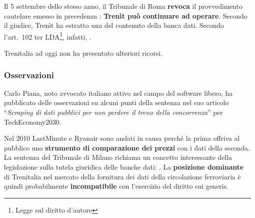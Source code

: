 \documentclass[12pt,a4paper,italian]{report}
\begin{document}
Il 5 settembre dello stesso anno, il Tribunale di Roma \textbf{revoca}
il provvedimento cautelare emesso in precedenza \cite{TrenitSentenza}:
\textbf{Trenìt può continuare ad operare}.  Secondo il giudice, Trenìt
ha estratto una  del
contenuto della banca dati.  Secondo l'art.\ 102 ter
LDA\footnote{Legge sul diritto d'autore}, infatti,
.

Trenitalia ad oggi non ha presentato ulteriori ricorsi.

\subsubsection{Osservazioni}

Carlo Piana, noto avvocato italiano attivo nel campo del software
libero, ha pubblicato delle osservazioni su alcuni punti della
sentenza nel suo articolo ``\textit{Scraping di dati pubblici per non
    perdere il treno della concorrenza}'' \cite{TrenitPiana} per
TechEconomy2030.

Nel 2010 LastMinute e Ryanair sono andati in causa perché la prima
offriva al pubblico uno \textbf{strumento di comparazione dei prezzi}
con i dati della seconda.  La sentenza \cite{RyanairSentenza} del
Tribunale di Milano richiama un concetto interessante della
legislazione sulla tutela giuridica delle banche dati:
.  La
\textbf{posizione dominante} di Trenitalia nel mercato della fornitura
dei dati della circolazione ferroviaria è quindi probabilmente
\textbf{incompatibile} con l'esercizio del diritto sui generis.
\end{document}
